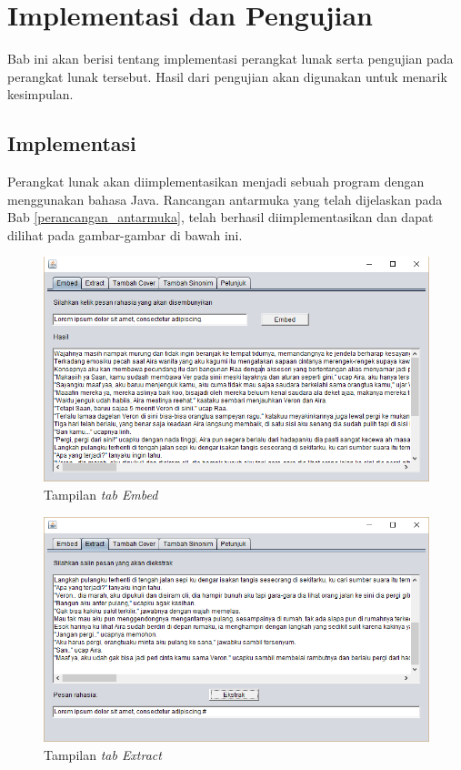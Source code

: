 \chapter{Implementasi dan Pengujian}
Bab ini akan berisi tentang implementasi perangkat lunak serta pengujian pada perangkat lunak tersebut. Hasil dari pengujian akan digunakan untuk menarik kesimpulan. 

\section{Implementasi}
Perangkat lunak akan diimplementasikan menjadi sebuah program dengan menggunakan bahasa Java. Rancangan antarmuka yang telah dijelaskan pada Bab \ref{perancangan_antarmuka}, telah berhasil diimplementasikan dan dapat dilihat pada gambar-gambar di bawah ini.

\begin{figure}[H]
	\centering
	\includegraphics[scale=0.8]{Gambar/ui-embed}
	\caption{Tampilan \textit{tab Embed}} 
	\label{fig:ui-embed}
\end{figure}

\begin{figure}[H]
	\centering
	\includegraphics[scale=0.8]{Gambar/ui-extract}
	\caption{Tampilan \textit{tab Extract}} 
	\label{fig:ui-extract}
\end{figure}

